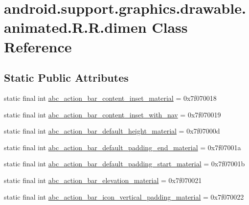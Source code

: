 \hypertarget{classandroid_1_1support_1_1graphics_1_1drawable_1_1animated_1_1_r_1_1dimen}{
\section{android.support.graphics.drawable.animated.R.R.dimen Class Reference}
\label{classandroid_1_1support_1_1graphics_1_1drawable_1_1animated_1_1_r_1_1dimen}
}
\subsection*{Static Public Attributes}
\begin{CompactItemize}
\item 
static final int \hyperlink{classandroid_1_1support_1_1graphics_1_1drawable_1_1animated_1_1_r_1_1dimen_23541f5243d7a49d0d76ffc4fef0fb38}{abc\_\-action\_\-bar\_\-content\_\-inset\_\-material} = 0x7f070018
\item 
static final int \hyperlink{classandroid_1_1support_1_1graphics_1_1drawable_1_1animated_1_1_r_1_1dimen_659b4f11ef3c007897f31cb92837025c}{abc\_\-action\_\-bar\_\-content\_\-inset\_\-with\_\-nav} = 0x7f070019
\item 
static final int \hyperlink{classandroid_1_1support_1_1graphics_1_1drawable_1_1animated_1_1_r_1_1dimen_9734c720c3e4bffe61ce2b9313033bc1}{abc\_\-action\_\-bar\_\-default\_\-height\_\-material} = 0x7f07000d
\item 
static final int \hyperlink{classandroid_1_1support_1_1graphics_1_1drawable_1_1animated_1_1_r_1_1dimen_fdb6eb2c5734e250d37967a8315a144d}{abc\_\-action\_\-bar\_\-default\_\-padding\_\-end\_\-material} = 0x7f07001a
\item 
static final int \hyperlink{classandroid_1_1support_1_1graphics_1_1drawable_1_1animated_1_1_r_1_1dimen_cdc120b183f886d9dc6fe724d563f068}{abc\_\-action\_\-bar\_\-default\_\-padding\_\-start\_\-material} = 0x7f07001b
\item 
static final int \hyperlink{classandroid_1_1support_1_1graphics_1_1drawable_1_1animated_1_1_r_1_1dimen_78827ca04707f7d9fdc52e8ccba83616}{abc\_\-action\_\-bar\_\-elevation\_\-material} = 0x7f070021
\item 
static final int \hyperlink{classandroid_1_1support_1_1graphics_1_1drawable_1_1animated_1_1_r_1_1dimen_2c9e31edf4ac5c9bc4ae0708399fc4fd}{abc\_\-action\_\-bar\_\-icon\_\-vertical\_\-padding\_\-material} = 0x7f070022
\item 

\end{CompactItemize}
